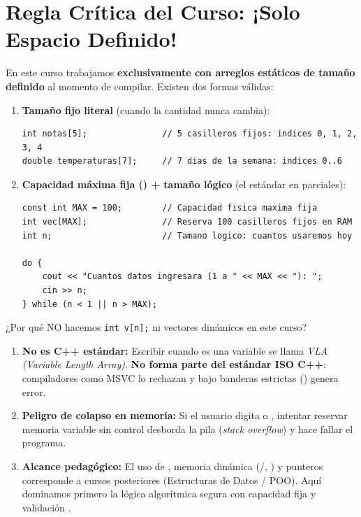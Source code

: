 \documentclass[11pt,letterpaper]{article}
\begin{document}

\section{Regla Crítica del Curso: ¡Solo Espacio Definido!}

En este curso trabajamos \textbf{exclusivamente con arreglos estáticos de tamaño definido} al momento de compilar. Existen dos formas válidas:

\begin{enumerate}
  \item \textbf{Tamaño fijo literal} (cuando la cantidad nunca cambia):
\begin{lstlisting}[style=cppmonitoria]
int notas[5];               // 5 casilleros fijos: indices 0, 1, 2, 3, 4
double temperaturas[7];     // 7 dias de la semana: indices 0..6
\end{lstlisting}
  \item \textbf{Capacidad máxima fija () + tamaño lógico } (el estándar en parciales):
\begin{lstlisting}[style=cppmonitoria]
const int MAX = 100;        // Capacidad fisica maxima fija
int vec[MAX];               // Reserva 100 casilleros fijos en RAM
int n;                      // Tamano logico: cuantos usaremos hoy

do {
    cout << "Cuantos datos ingresara (1 a " << MAX << "): ";
    cin >> n;
} while (n < 1 || n > MAX);
\end{lstlisting}
\end{enumerate}

\begin{peligro}{¿Por qué NO hacemos \texttt{int v[n];} ni vectores dinámicos en este curso?}
\begin{enumerate}
  \item \textbf{No es C++ estándar:} Escribir  cuando  es una variable se llama \emph{VLA (Variable Length Array)}. \textbf{No forma parte del estándar ISO C++}: compiladores como MSVC lo rechazan y bajo banderas estrictas () genera error.
  \item \textbf{Peligro de colapso en memoria:} Si el usuario digita  o , intentar reservar memoria variable sin control desborda la pila (\emph{stack overflow}) y hace fallar el programa.
  \item \textbf{Alcance pedagógico:} El uso de , memoria dinámica (/, ) y punteros corresponde a cursos posteriores (Estructuras de Datos / POO). Aquí dominamos primero la lógica algorítmica segura con capacidad fija  y validación .
\end{enumerate}
\end{peligro}
\end{document}
